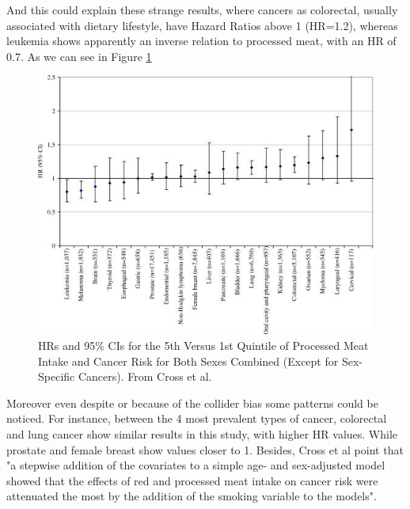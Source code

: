 \documentclass{article}
\begin{document}
And this could explain these strange results, where cancers as colorectal, usually associated with dietary lifestyle, have Hazard Ratios above 1 (HR=1.2), whereas leukemia shows apparently an inverse relation to processed meat, with an HR of 0.7. As we can see in Figure \ref{fig:cross}
\begin{figure}
  \includegraphics[scale=0.75]{tileshop2}
  \caption{HRs and 95\% CIs for the 5th Versus 1st Quintile of Processed Meat Intake and Cancer Risk for Both Sexes Combined (Except for Sex-Specific Cancers). From Cross et al.\cite{cross}}
  \label{fig:cross}
\end{figure}



Moreover even despite or because of the collider bias some patterns could be noticed. For instance, between the 4 most prevalent types of cancer, colorectal and lung cancer show similar results in this study, with higher HR values. While prostate and female breast show values closer to 1. Besides, Cross et al point that "a stepwise addition of the covariates to a simple age- and sex-adjusted model showed that the effects of red and processed meat intake on cancer risk were attenuated the most by the addition of the smoking variable to the models". %
\end{document}
